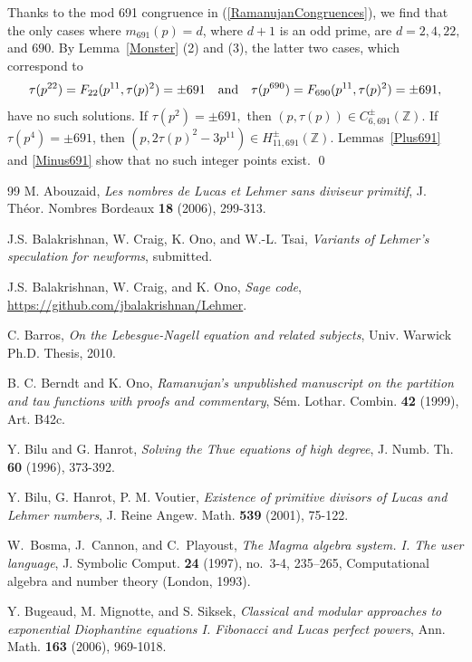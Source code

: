 \documentclass[12pt]{amsart}
\newcommand{\Z}{\mathbb{Z}}
\numberwithin{equation}{section}
\begin{document}
Thanks to the mod 691 congruence in (\ref{RamanujanCongruences}), we find that
the only cases where $m_{691}(p)=d$, where $d+1$ is an odd prime, are $d=2, 4, 22,$ and $690$.
By Lemma~\ref{Monster} (2) and (3), the latter two cases, which correspond to
$$
\tau(p^{22})=F_{22}(p^{11},\tau(p)^2)=\pm 691 \ \ \ {\text {\rm and}}\ \ \ 
\tau(p^{690})=F_{690}(p^{11},\tau(p)^2)=\pm 691,
$$
have no such solutions.  If $\tau(p^2)=\pm 691,$ then $(p,\tau(p))\in C^{\pm}_{6,691}(\Z)$.
If $\tau(p^4)=\pm 691$, then $(p, 2\tau(p)^2-3p^{11})\in H^{\pm}_{11,691}(\Z)$.
Lemmas~\ref{Plus691} and \ref{Minus691} show that no such integer points exist.
\qed



\begin{thebibliography}{99}
 M. Abouzaid, \emph{Les nombres de Lucas et Lehmer sans diviseur primitif},
J. Th\'eor. Nombres Bordeaux \textbf{18} (2006), 299-313.

 J.\thinspace{}S. Balakrishnan, W.  Craig, K. Ono, and W.-L. Tsai, \emph{Variants of Lehmer's speculation for newforms},
submitted.

 J.\thinspace{}S. Balakrishnan, W. Craig, and K. Ono, \emph{Sage code},  \url{https://github.com/jbalakrishnan/Lehmer}.

 C. Barros, \emph{On the Lebesgue-Nagell equation and related subjects},
Univ. Warwick Ph.D. Thesis, 2010.

 B. C. Berndt and K. Ono, \emph{Ramanujan's unpublished manuscript on the partition and tau functions with proofs
and commentary}, S\'em. Lothar. Combin. \textbf{42} (1999), Art. B42c.

 Y. Bilu and G. Hanrot, \emph{Solving the Thue equations of high degree}, J. Numb. Th.
\textbf{60} (1996), 373-392.

 Y. Bilu, G. Hanrot, P. M. Voutier, \emph{Existence of primitive divisors of Lucas and Lehmer numbers},
J. Reine Angew. Math.  \textbf{539} (2001), 75-122.

W.~Bosma, J.~Cannon, and C.~Playoust, \emph{The {M}agma algebra system. {I}.
  {T}he user language}, J. Symbolic Comput. \textbf{24} (1997), no.~3-4,
  235--265, Computational algebra and number theory (London, 1993). \MR{1 484
  478}
  
 Y. Bugeaud, M. Mignotte, and S. Siksek, \emph{Classical and modular approaches to exponential
Diophantine equations I. Fibonacci and Lucas perfect powers}, Ann. Math. \textbf{163} (2006), 969-1018.


\end{thebibliography}
\end{document}

